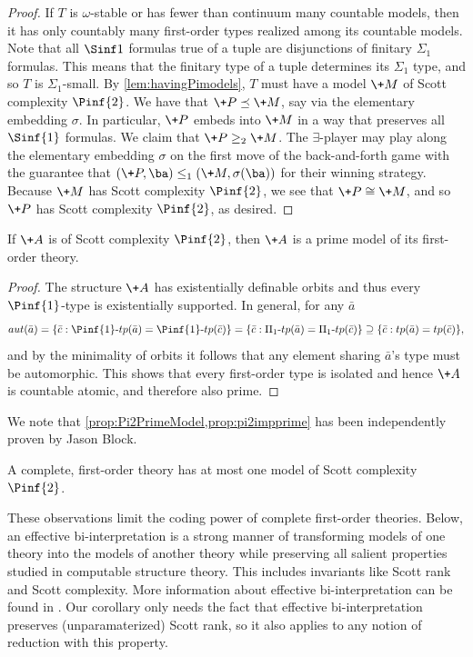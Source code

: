 \documentclass[10pt,a4paper]{amsart}
\renewcommand{\-}{\text{-}}
\begin{document}
\begin{proof}
If $T$ is $\omega$-stable or has fewer than continuum many countable models, then it has only countably many first-order types realized among its countable models.
Note that all $\Sinf1$ formulas true of a tuple are disjunctions of finitary $\Sigma_1$ formulas.
This means that the finitary type of a tuple determines its $\Sigma_1$ type, and so $T$ is $\Sigma_1$-small.
By \cref{lem:havingPimodels}, $T$ must have a model $\+M$ of Scott complexity $\Pinf{2}$.
We have that $\+P\preceq \+M$, say via the elementary embedding $\sigma$.
In particular, $\+P$ embeds into $\+M$ in a way that preserves all $\Sinf{1}$ formulas.
We claim that $\+P\geq_2\+M$.
The $\exists$-player may play along the elementary embedding $\sigma$ on the first move of the back-and-forth game with the guarantee that $(\+P,\ba)\leq_1(\+M,\sigma(\ba))$ for their winning strategy.
Because $\+M$ has Scott complexity $\Pinf{2}$, we see that $\+P\cong \+M$, and so $\+P$ has Scott complexity $\Pinf{2}$, as desired.
\end{proof}
%
\begin{proposition}\label{prop:pi2impprime}
  If $\+A$ is of Scott complexity $\Pinf{2}$, then $\+A$ is a prime model of its first-order theory.
\end{proposition}
\begin{proof}
  The structure $\+A$ has existentially definable orbits and thus every $\Pinf{1}$-type is existentially supported. In general, for any $\bar a$
  \[ aut(\bar a)=\{ \bar c: \Pinf{1}\-tp(\bar a)=\Pinf{1}\-tp(\bar c)\}=\{ \bar c: \Pi_{1}\-tp(\bar a)=\Pi_{1}\-tp(\bar c)\}\supseteq \{ \bar c: tp(\bar a)=tp(\bar c)\},\] 
  and by the minimality of orbits it follows that any element sharing $\bar a$'s type must be automorphic. This shows that every first-order type is isolated and hence $\+A$ is countable atomic, and therefore also prime.
\end{proof}
We note that \cref{prop:Pi2PrimeModel,prop:pi2impprime} has been independently proven by Jason Block.
\begin{corollary}
A complete, first-order theory has at most one model of Scott complexity $\Pinf{2}$.
\end{corollary}


These observations limit the coding power of complete first-order theories.
Below, an effective bi-interpretation is a strong manner of transforming models of one theory into the models of another theory while preserving all salient properties studied in computable structure theory.
This includes invariants like Scott rank and Scott complexity.
More information about effective bi-interpretation can be found in \cite[Chapter VI.4]{Part1}.
Our corollary only needs the fact that effective bi-interpretation preserves (unparamaterized) Scott rank, so it also applies to any notion of reduction with this property.
\end{document}
